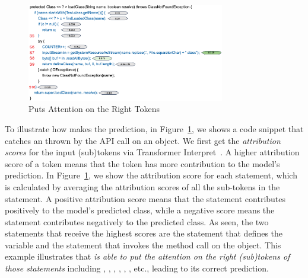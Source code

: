 \begin{figure}[t]
 	\centering
 	\includegraphics[width=3.4in]{rq1-case-study.png}
        \vspace{-20pt}
 	\caption{{\xblock} Puts Attention on the Right Tokens}
 	\label{fig:rq1-case}	
\end{figure}

 To illustrate how {\xblock} makes
the prediction, in Figure~\ref{fig:rq1-case}, we shows a code snippet
that catches an  thrown by the 
API call on an  object.
%
We first get the {\em attribution scores} for the input (sub)tokens
via Transformer Interpret~\cite{transformers-interpret}. A higher
attribution score of a token means that the token has more
contribution to the model's prediction. In Figure~\ref{fig:rq1-case},
we show the attribution score for each statement, which is calculated
by averaging the attribution scores of all the sub-tokens in the
statement.
%
%
A positive attribution score means that the statement contributes
positively to the model's predicted class, while a negative score
means the statement contributes negatively to the predicted class.  As
seen, the two statements that receive the highest scores are the
statement that defines the  variable and the
statement that invokes the  method call on the
 object. This example illustrates that {\em {\tool} is
able to put the attention on the right (sub)tokens of those statements}
including , , , ,
, , etc., leading to its correct prediction.


